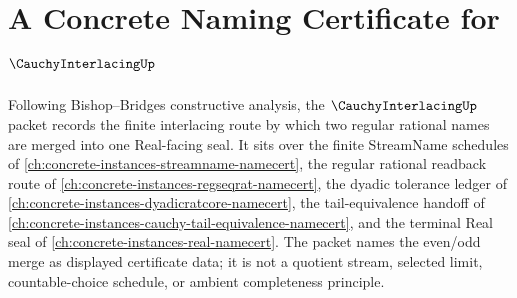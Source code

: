 \chapter{A Concrete Naming Certificate for $\CauchyInterlacingUp$}
\label{ch:concrete-instances-cauchy-interlacing-namecert}

Following Bishop--Bridges constructive analysis, the $\CauchyInterlacingUp$ packet records the finite interlacing route by which two regular rational names are merged into one Real-facing seal. It sits over the finite StreamName schedules of \autoref{ch:concrete-instances-streamname-namecert}, the regular rational readback route of \autoref{ch:concrete-instances-regseqrat-namecert}, the dyadic tolerance ledger of \autoref{ch:concrete-instances-dyadicratcore-namecert}, the tail-equivalence handoff of \autoref{ch:concrete-instances-cauchy-tail-equivalence-namecert}, and the terminal Real seal of \autoref{ch:concrete-instances-real-namecert}. The packet names the even/odd merge as displayed certificate data; it is not a quotient stream, selected limit, countable-choice schedule, or ambient completeness principle.

